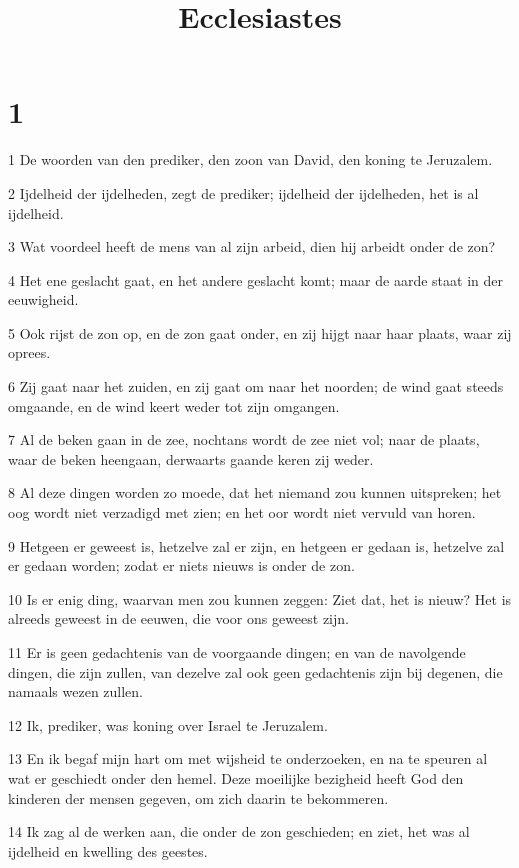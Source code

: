 

\title{Ecclesiastes}



\chapter{1}

\par 1 De woorden van den prediker, den zoon van David, den koning te Jeruzalem.
\par 2 Ijdelheid der ijdelheden, zegt de prediker; ijdelheid der ijdelheden, het is al ijdelheid.
\par 3 Wat voordeel heeft de mens van al zijn arbeid, dien hij arbeidt onder de zon?
\par 4 Het ene geslacht gaat, en het andere geslacht komt; maar de aarde staat in der eeuwigheid.
\par 5 Ook rijst de zon op, en de zon gaat onder, en zij hijgt naar haar plaats, waar zij oprees.
\par 6 Zij gaat naar het zuiden, en zij gaat om naar het noorden; de wind gaat steeds omgaande, en de wind keert weder tot zijn omgangen.
\par 7 Al de beken gaan in de zee, nochtans wordt de zee niet vol; naar de plaats, waar de beken heengaan, derwaarts gaande keren zij weder.
\par 8 Al deze dingen worden zo moede, dat het niemand zou kunnen uitspreken; het oog wordt niet verzadigd met zien; en het oor wordt niet vervuld van horen.
\par 9 Hetgeen er geweest is, hetzelve zal er zijn, en hetgeen er gedaan is, hetzelve zal er gedaan worden; zodat er niets nieuws is onder de zon.
\par 10 Is er enig ding, waarvan men zou kunnen zeggen: Ziet dat, het is nieuw? Het is alreeds geweest in de eeuwen, die voor ons geweest zijn.
\par 11 Er is geen gedachtenis van de voorgaande dingen; en van de navolgende dingen, die zijn zullen, van dezelve zal ook geen gedachtenis zijn bij degenen, die namaals wezen zullen.
\par 12 Ik, prediker, was koning over Israel te Jeruzalem.
\par 13 En ik begaf mijn hart om met wijsheid te onderzoeken, en na te speuren al wat er geschiedt onder den hemel. Deze moeilijke bezigheid heeft God den kinderen der mensen gegeven, om zich daarin te bekommeren.
\par 14 Ik zag al de werken aan, die onder de zon geschieden; en ziet, het was al ijdelheid en kwelling des geestes.
